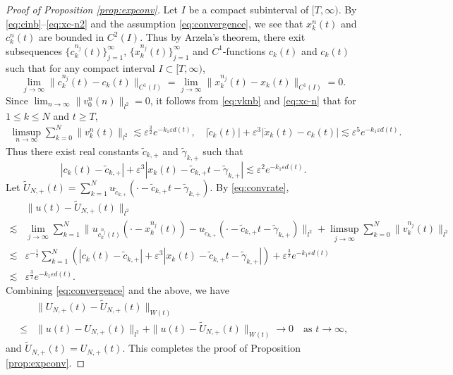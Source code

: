\documentclass[11pt]{amsart}
\theoremstyle{remark}
\numberwithin{equation}{section}
\begin{document}
\begin{proof}[Proof of Proposition \ref{prop:expconv}]
Let $I$ be a compact subinterval of $[T,\infty)$.
By \eqref{eq:cinb}--\eqref{eq:xc-n2} and the assumption \eqref{eq:convergence},
we see that $x_k^n(t)$ and $c_k^n(t)$ are bounded in $C^2(I)$.
Thus by Arzela's theorem, there exit subsequences
$\{c_k^{n_j}(t)\}_{j=1}^\infty$, $\{x_k^{n_j}(t)\}_{j=1}^\infty$ and
$C^1$-functions $c_k(t)$ and $c_k(t)$ such that for any compact interval
$I\subset [T,\infty)$,
$$\lim_{j\to\infty}\|c_k^{n_j}(t)-c_k(t)\|_{C^1(I)}
=\lim_{j\to\infty}\|x_k^{n_j}(t)-x_k(t)\|_{C^1(I)}=0.$$
Since $\lim_{n\to\infty}\|v_0^n(n)\|_{l^2}=0$, it follows from \eqref{eq:vknb}
and \eqref{eq:xc-n} that for $1\le k\le N$ and $t\ge T$,
\begin{gather*}
\limsup_{n\to\infty}\sum_{k=0}^N\|v_k^n(t)\|_{l^2}\lesssim{\varepsilon}^{\frac32}e^{-k_1{\varepsilon} d(t)},
\quad 
|\dot{c}_k(t)|+{\varepsilon}^3|\dot{x}_k(t)-c_k(t)|\lesssim {\varepsilon}^5e^{-k_1{\varepsilon} d(t)}.
\end{gather*}
Thus there exist real constants $\tilde{c}_{k,+}$ and $\tilde{\gamma}_{k,+}$
such that
\begin{equation}
\label{eq:convrate}
|c_k(t)-\tilde{c}_{k,+}|+{\varepsilon}^3|x_k(t)-\tilde{c}_{k,+}t-\tilde{\gamma}_{k,+}|
\lesssim {\varepsilon}^2e^{-k_1{\varepsilon} d(t)}.
\end{equation}
Let $\widetilde{U}_{N,+}(t)=\sum_{k=1}^Nu_{\tilde{c}_{k,+}}
(\cdot-\tilde{c}_{k,+}t-\tilde{\gamma}_{k,+})$.
By \eqref{eq:convrate},
\begin{align*}
&  \|u(t)-\widetilde{U}_{N,+}(t)\|_{l^2}
\\ \lesssim & \lim_{j\to\infty}\sum_{k=1}^N\|u_{c_k^{n_j}(t)}(\cdot-x_k^{n_j}(t))
-u_{\tilde{c}_{k,+}}(\cdot-\tilde{c}_{k,+}t-\tilde{\gamma}_{k,+})\|_{l^2}
+\limsup_{j\to\infty}\sum_{k=0}^N\|v_k^{n_j}(t)\|_{l^2}
\\ \lesssim &
{\varepsilon}^{-\frac12}\sum_{k=1}^N\left(|c_k(t)-\tilde{c}_{k,+}|
+{\varepsilon}^3|x_k(t)-\tilde{c}_{k,+}t-\tilde{\gamma}_{k,+}|\right)
+{\varepsilon}^{\frac32}e^{-k_1{\varepsilon} d(t)}
\\ \lesssim & {\varepsilon}^{\frac32}e^{-k_1{\varepsilon} d(t)}.
\end{align*}
Combining \eqref{eq:convergence} and the above, we have
\begin{align*}
&  \|U_{N,+}(t)-\widetilde{U}_{N,+}(t)\|_{W(t)}
\\ \le &
 \|u(t)-U_{N,+}(t)\|_{l^2}+\|u(t)-\widetilde{U}_{N,+}(t)\|_{W(t)}\to0
\quad\text{as $t\to\infty$,}
\end{align*}
and $\widetilde{U}_{N,+}(t)=U_{N,+}(t)$.
This completes the proof of Proposition \ref{prop:expconv}.
\end{proof}
\end{document}
